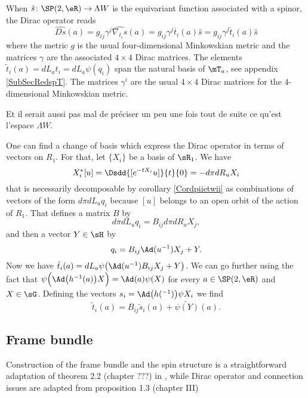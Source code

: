 When $\hat{s}\colon \SP(2,\eR) \to \Lambda W$ is the equivariant function associated with a spinor, the Dirac operator reads
\begin{equation}        \label{EqDiracAdsquatre}
\widehat{Ds}(a)=g_{ij}\gamma^j\widehat{\nabla_{t_i}s}(a)
        =g_{ij}\gamma^j\overline{ t }_i(a)\hat{s}
        =g_{ij}\gamma^j\tilde t_i(a)\hat{s}
\end{equation}
where the metric $g$ is the usual four-dimensional Minkowskian metric and the matrices $\gamma$ are the associated $4\times 4$ Dirac matrices. The elements $\tilde t_i(a)=dL_at_i=dL_a\psi(q_i)$ span the natural basis of $\mT_a$, see appendix \ref{SubSecRedspT}. The matrices $\gamma^i$ are the usual $4\times 4$ Dirac matrices for the $4$-dimensional Minkowskian metric.

\begin{probleme}
Et il serait aussi pas mal de préciser un peu une fois tout de suite ce qu'est l'espace $\Lambda W$.
\end{probleme}

One can find a change of basis which express the Dirac operator in terms of vectors on $R_1$. For that, let $\{ X_i \}$ be a basis of $\sR_1$. We have 
\[ 
  X^*_i[u]=\Dsdd{ [ e^{-tX_i}u] }{t}{0}=-d\pi dR_uX_i
\]
that is necessarily decomposable by corollary \ref{Cordpiietwii} as combinations of vectors of the form $d\pi dL_uq_i$ because $[u]$ belongs to an open orbit of the action of $R_1$. That defines a matrix $B$ by
\[ 
  d\pi dL_uq_i=B_{ij}d\pi dR_uX_j,
\]
and then a vector $Y\in \sH$ by
\begin{equation}
q_i=B_{ij}\Ad(u^{-1})X_j+Y.
\end{equation}
Now we have $\tilde t_i(a)=dL_a\psi\big( \Ad(u^{-1})B_{ij}X_j+Y \big)$. We can go further using the fact that $\psi\Big( \Ad\big( h^{-1}(a) \big)X \Big)=\Ad(a)\psi(X)$ for every $a\in\SP(2,\eR)$ and $X\in\sG$. Defining the vectors $s_i=\Ad\big( h(^{-1}) \big)\psi X_i$ we find
\begin{equation}
\tilde t_i(a)=B_{ij}\tilde s_i(a)+\widetilde{\psi(Y)}(a).
\end{equation}

\subsection{Frame bundle}

Construction of the frame bundle and the spin structure is a straightforward adaptation of theorem 2.2 (chapter ???) in \cite{AnnikFranc}, while Dirac operator and connection issues are adapted from proposition 1.3 (chapter III)

